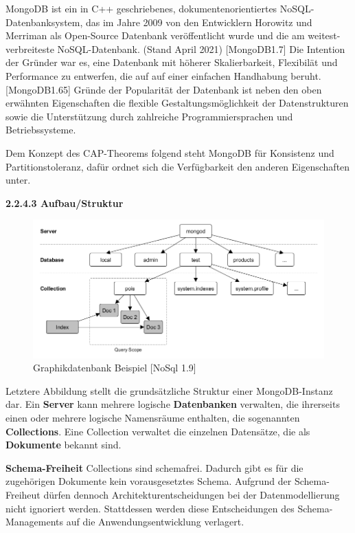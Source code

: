 MongoDB ist ein in C++ geschriebenes, dokumentenorientiertes NoSQL-Datenbanksystem, das im Jahre 2009 von den Entwicklern Horowitz und Merriman als Open-Source Datenbank veröffentlicht wurde und die am weitest-verbreiteste NoSQL-Datenbank. (Stand April 2021) [MongoDB1.7] Die Intention der Gründer war es, eine Datenbank mit höherer Skalierbarkeit, Flexibilät und Performance zu entwerfen, die auf auf einer einfachen Handhabung beruht. [MongoDB1.65]
Gründe der Popularität der Datenbank ist neben den oben erwähnten Eigenschaften die flexible Gestaltungsmöglichkeit der Datenstrukturen sowie die Unterstützung durch zahlreiche Programmiersprachen und Betriebssysteme.

Dem Konzept des CAP-Theorems folgend steht MongoDB für Konsistenz und Partitionstoleranz, dafür ordnet sich die Verfügbarkeit den anderen Eigenschaften unter.
\newline

\textbf{2.2.4.3 Aufbau/Struktur}
\newline

\begin{figure}[htb]
\centering
\includegraphics[width=14cm]{images/MongoDB_Architektur.png}
\caption{Graphikdatenbank Beispiel [NoSql 1.9]}
\end{figure}

Letztere Abbildung stellt die grundsätzliche Struktur einer MongoDB-Instanz dar.
Ein \textbf{Server} kann mehrere logische \textbf{Datenbanken} verwalten, die ihrerseits einen oder mehrere logische Namensräume enthalten, die sogenannten \textbf{Collections}. Eine Collection verwaltet die einzelnen Datensätze, die als \textbf{Dokumente} bekannt sind. 
\newline

\textbf{Schema-Freiheit}
\newline
Collections sind schemafrei. Dadurch gibt es für die zugehörigen Dokumente kein vorausgesetztes Schema. Aufgrund der Schema-Freiheut dürfen dennoch Architekturentscheidungen bei der Datenmodellierung nicht ignoriert werden. Stattdessen werden diese Entscheidungen des Schema-Managements auf die Anwendungsentwicklung verlagert.
\newline


